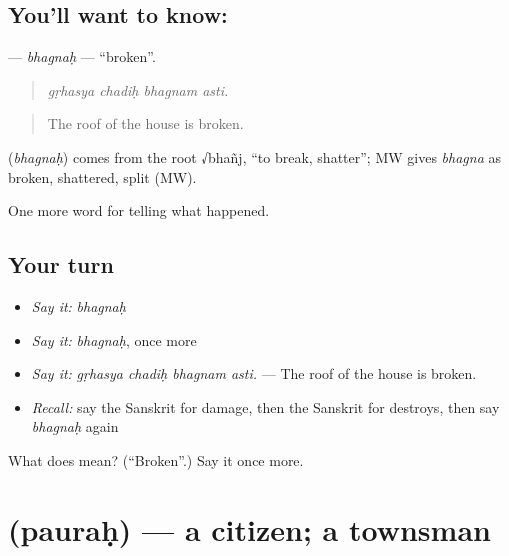 \subsection*{You'll want to know: }
\textbf{} — \emph{bhagnaḥ} — \textquotedblleft{}broken\textquotedblright{}.

\begin{quote}
   
\end{quote}

\begin{quote}
\emph{gṛhasya chadiḥ bhagnam asti.}
\end{quote}

\begin{quote}
The roof of the house is broken.
\end{quote}

\begin{cousinweb}
\textbf{} (\emph{bhagnaḥ}) comes from the root √bhañj, \textquotedblleft{}to break, shatter\textquotedblright{}; MW gives \emph{bhagna} as broken, shattered, split (MW).
\end{cousinweb}

\begin{grammarlens}[title={What you've built}]
One more word for telling what happened.
\end{grammarlens}

\subsection*{Your turn}
\begin{itemize}
\raggedright
  \item \emph{Say it:} \emph{bhagnaḥ}
  \item \emph{Say it:} \emph{bhagnaḥ}, once more
  \item \emph{Say it:} \emph{gṛhasya chadiḥ bhagnam asti.} — The roof of the house is broken.
  \item \emph{Recall:} say the Sanskrit for damage, then the Sanskrit for destroys, then say \emph{bhagnaḥ} again
\end{itemize}

\begin{tcolorbox}[breakable,colback=teal!4,colframe=teal!35!black,title={Before you move on}]
What does  mean? (\textquotedblleft{}Broken\textquotedblright{}.) Say it once more.
\end{tcolorbox}
\section[\texorpdfstring{\sk{पौरः} (pauraḥ)}{पौरः (pauraḥ)}]{ (pauraḥ) — a citizen; a townsman}

